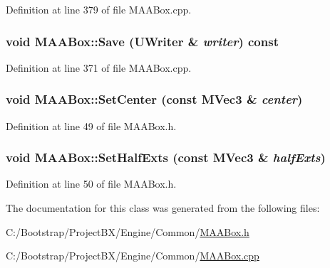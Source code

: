 Definition at line 379 of file MAABox.cpp.\hypertarget{class_m_a_a_box_c24b0c3002a56fd52de6628e1864e485}{
\subsubsection[{Save}]{\setlength{\rightskip}{0pt plus 5cm}void MAABox::Save ({\bf UWriter} \& {\em writer}) const}}
\label{class_m_a_a_box_c24b0c3002a56fd52de6628e1864e485}




Definition at line 371 of file MAABox.cpp.\hypertarget{class_m_a_a_box_65a37e6adae9f465bb0ac964f4bfbe63}{
\subsubsection[{SetCenter}]{\setlength{\rightskip}{0pt plus 5cm}void MAABox::SetCenter (const {\bf MVec3} \& {\em center})}}
\label{class_m_a_a_box_65a37e6adae9f465bb0ac964f4bfbe63}




Definition at line 49 of file MAABox.h.\hypertarget{class_m_a_a_box_9ce3a23bc3cfa705d6776807289bd178}{
\subsubsection[{SetHalfExts}]{\setlength{\rightskip}{0pt plus 5cm}void MAABox::SetHalfExts (const {\bf MVec3} \& {\em halfExts})}}
\label{class_m_a_a_box_9ce3a23bc3cfa705d6776807289bd178}




Definition at line 50 of file MAABox.h.

The documentation for this class was generated from the following files:\begin{CompactItemize}
\item 
C:/Bootstrap/ProjectBX/Engine/Common/\hyperlink{_m_a_a_box_8h}{MAABox.h}\item 
C:/Bootstrap/ProjectBX/Engine/Common/\hyperlink{_m_a_a_box_8cpp}{MAABox.cpp}\end{CompactItemize}
